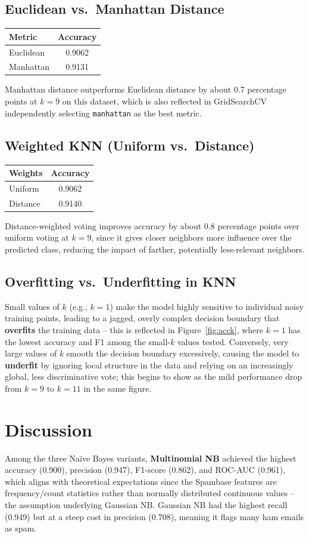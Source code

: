 \documentclass[12pt,a4paper]{article}
\begin{document}
\subsection*{Euclidean vs.\ Manhattan Distance}
\begin{tabular}{lc}
\toprule
Metric & Accuracy \\
\midrule
Euclidean & 0.9062 \\
Manhattan & 0.9131 \\
\bottomrule
\end{tabular}

Manhattan distance outperforms Euclidean distance by about 0.7 percentage points at
$k=9$ on this dataset, which is also reflected in GridSearchCV independently selecting
\texttt{manhattan} as the best metric.

\subsection*{Weighted KNN (Uniform vs.\ Distance)}
\begin{tabular}{lc}
\toprule
Weights & Accuracy \\
\midrule
Uniform & 0.9062 \\
Distance & 0.9140 \\
\bottomrule
\end{tabular}

Distance-weighted voting improves accuracy by about 0.8 percentage points over uniform
voting at $k=9$, since it gives closer neighbors more influence over the predicted
class, reducing the impact of farther, potentially less-relevant neighbors.

\subsection*{Overfitting vs.\ Underfitting in KNN}
Small values of $k$ (e.g., $k=1$) make the model highly sensitive to individual noisy
training points, leading to a jagged, overly complex decision boundary that
\textbf{overfits} the training data -- this is reflected in Figure~\ref{fig:acck}, where
$k=1$ has the lowest accuracy and F1 among the small-$k$ values tested. Conversely,
very large values of $k$ smooth the decision boundary excessively, causing the model to
\textbf{underfit} by ignoring local structure in the data and relying on an
increasingly global, less discriminative vote; this begins to show as the mild
performance drop from $k=9$ to $k=11$ in the same figure.

\section{Discussion}
Among the three Na\"ive Bayes variants, \textbf{Multinomial NB} achieved the highest
accuracy (0.900), precision (0.947), F1-score (0.862), and ROC-AUC (0.961), which
aligns with theoretical expectations since the Spambase features are frequency/count
statistics rather than normally distributed continuous values -- the assumption
underlying Gaussian NB. Gaussian NB had the highest recall (0.949) but at a steep cost
in precision (0.708), meaning it flags many ham emails as spam.
\end{document}
